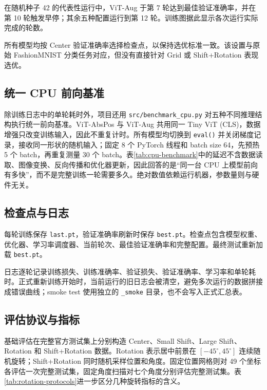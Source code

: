 在随机种子 42 的代表性运行中，ViT-Aug 于第 7 轮达到最佳验证准确率，并在第 10 轮触发早停；其余五种配置运行到第 12 轮。训练图据此显示各次运行实际完成的轮数。

所有模型均按 Center 验证准确率选择检查点，以保持选优标准一致。该设置与原始 FashionMNIST 分类任务对应，但没有直接针对 Grid 或 Shift+Rotation 表现选优。

\subsection{统一 CPU 前向基准}

除训练日志中的单轮耗时外，项目还用 \texttt{src/benchmark\_cpu.py} 对五种不同推理结构执行统一前向基准。ViT-AbsPos 与 ViT-Aug 共用同一 Tiny ViT (CLS)，数据增强只改变训练输入，因此不重复计时。所有模型均切换到 \texttt{eval()} 并关闭梯度记录，接收同一形状的随机输入；固定 8 个 PyTorch 线程和 batch size 64，先预热 5 个 batch，再重复测量 30 个 batch。表\ref{tab:cpu-benchmark}中的延迟不含数据读取、图像变换、反向传播和优化器更新，因此回答的是“同一台 CPU 上模型前向有多快”，而不是完整训练一轮需要多久。绝对数值依赖运行机器，参数量则与硬件无关。



\subsection{检查点与日志}

每轮训练保存 \texttt{last.pt}，验证准确率刷新时保存 \texttt{best.pt}。检查点包含模型权重、优化器、学习率调度器、当前轮次、最佳验证准确率和完整配置。最终测试重新加载 \texttt{best.pt}。

日志逐轮记录训练损失、训练准确率、验证损失、验证准确率、学习率和单轮耗时。正式重新训练开始时，当前运行的旧日志会被清空，避免多次运行的数据拼接成错误曲线；smoke test 使用独立的 \texttt{\_smoke} 目录，也不会写入正式汇总表。

\subsection{评估协议与指标}

基础评估在完整官方测试集上分别构造 Center、Small Shift、Large Shift、Rotation 和 Shift+Rotation 数据。Rotation 表示居中前景在 $[-45^\circ,45^\circ]$ 连续随机旋转；Shift+Rotation 同时随机采样位置和角度。固定位置网格则对 49 个坐标各评估一次完整测试集，固定角度扫描对七个角度分别评估完整测试集。表\ref{tab:rotation-protocols}进一步区分几种旋转指标的含义。

